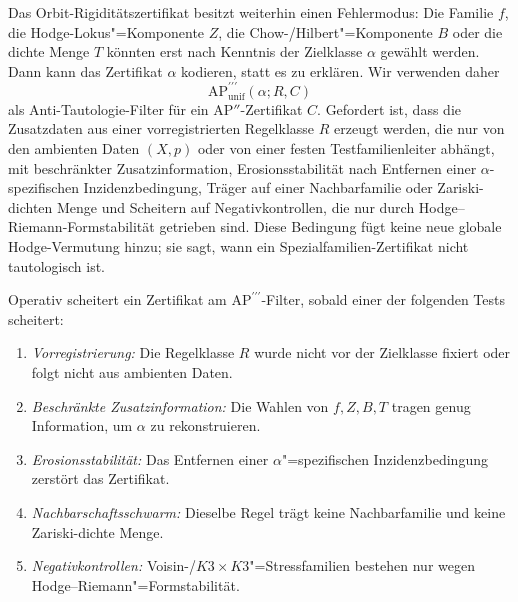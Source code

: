 \documentclass[aps,prd,twocolumn,superscriptaddress,nofootinbib]{revtex4-2}
\theoremstyle{definition}
\theoremstyle{remark}
\begin{document}
Das Orbit-Rigiditätszertifikat besitzt weiterhin einen Fehlermodus: Die
Familie $f$, die Hodge-Lokus"=Komponente $Z$, die Chow-/Hilbert"=Komponente
$B$ oder die dichte Menge $T$ könnten erst nach Kenntnis der Zielklasse
$\alpha$ gewählt werden. Dann kann das Zertifikat $\alpha$ kodieren, statt
es zu erklären. Wir verwenden daher
\[
\mathrm{AP}^{\prime\prime\prime}_{\mathrm{unif}}(\alpha;R,C)
\]
als Anti-Tautologie-Filter für ein $\mathrm{AP}''$-Zertifikat $C$. Gefordert
ist, dass die Zusatzdaten aus einer vorregistrierten Regelklasse $R$ erzeugt
werden, die nur von den ambienten Daten $(X,p)$ oder von einer festen
Testfamilienleiter abhängt, mit beschränkter Zusatzinformation, Erosionsstabilität
nach Entfernen einer $\alpha$-spezifischen Inzidenzbedingung, Träger auf
einer Nachbarfamilie oder Zariski-dichten Menge und Scheitern auf
Negativkontrollen, die nur durch Hodge--Riemann-Formstabilität getrieben
sind. Diese Bedingung fügt keine neue globale Hodge-Vermutung hinzu; sie
sagt, wann ein Spezialfamilien-Zertifikat nicht tautologisch ist.

Operativ scheitert ein Zertifikat am
$\mathrm{AP}^{\prime\prime\prime}$-Filter, sobald einer der folgenden Tests
scheitert:
\begin{enumerate}
\item \emph{Vorregistrierung:} Die Regelklasse $R$ wurde nicht vor der
  Zielklasse fixiert oder folgt nicht aus ambienten Daten.
\item \emph{Beschränkte Zusatzinformation:} Die Wahlen von $f,Z,B,T$ tragen genug
  Information, um $\alpha$ zu rekonstruieren.
\item \emph{Erosionsstabilität:} Das Entfernen einer $\alpha$"=spezifischen
  Inzidenzbedingung zerstört das Zertifikat.
\item \emph{Nachbarschaftsschwarm:} Dieselbe Regel trägt keine
  Nachbarfamilie und keine Zariski-dichte Menge.
\item \emph{Negativkontrollen:} Voisin-/$K3\times K3$"=Stressfamilien
  bestehen nur wegen Hodge--Riemann"=Formstabilität.
\end{enumerate}
\end{document}
